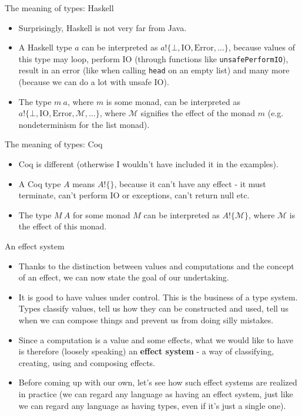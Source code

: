 \documentclass{beamer}
\newcommand{\eff}[2]{#1 ! \{ #2 \}}
\begin{document}
\begin{frame}{The meaning of types: Haskell}
\begin{itemize}
	\item Surprisingly, Haskell is not very far from Java.
	\item A Haskell type $a$ can be interpreted as $\eff{a}{\bot, \text{IO}, \text{Error}, \dots}$, because values of this type may loop, perform IO (through functions like \texttt{unsafePerformIO}), result in an error (like when calling \texttt{head} on an empty list) and many more (because we can do a lot with unsafe IO).
	\item The type $m\ a$, where $m$ is some monad, can be interpreted as $\eff{a}{\bot, \text{IO}, \text{Error}, \mathcal{M}, \dots}$, where $\mathcal{M}$ signifies the effect of the monad $m$ (e.g. nondeterminism for the list monad).
\end{itemize}
\end{frame}

\begin{frame}{The meaning of types: Coq}
\begin{itemize}
	\item Coq is different (otherwise I wouldn't have included it in the examples).
	\item A Coq type $A$ means $\eff{A}{}$, because it can't have any effect - it must terminate, can't perform IO or exceptions, can't return null etc.
	\item The type $M\ A$ for some monad $M$ can be interpreted as $\eff{A}{\mathcal{M}}$, where $\mathcal{M}$ is the effect of this monad.
\end{itemize}
\end{frame}

\begin{frame}{An effect system}
\begin{itemize}
	\item Thanks to the distinction between values and computations and the concept of an effect, we can now state the goal of our undertaking.
	\item It is good to have values under control. This is the business of a type system. Types classify values, tell us how they can be constructed and used, tell us when we can compose things and prevent us from doing silly mistakes.
	\item Since a computation is a value and some effects, what we would like to have is therefore (loosely speaking) an \textbf{effect system} - a way of classifying, creating, using and composing effects.
	\item Before coming up with our own, let's see how such effect systems are realized in practice (we can regard any language as having an effect system, just like we can regard any language as having types, even if it's just a single one).
\end{itemize}
\end{frame}
\end{document}
